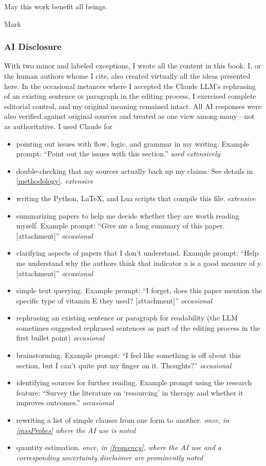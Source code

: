 \documentclass[11pt,oneside]{book}
\begin{document}
May this work benefit all beings.

Mark

\subsubsection*{AI Disclosure}
With two minor and labeled exceptions, I wrote all the content in this book. I, or the human authors whome I cite, also created virtually all the ideas presented here. In the occasional instances where I accepted the Claude LLM's rephrasing of an existing sentence or paragraph in the editing process, I exercised complete editorial control, and my original meaning remained intact. All AI responses were also verified against original sources and treated as one view among many---not as authoritative. I used Claude for
\begin{itemize}
    \item pointing out issues with flow, logic, and grammar in my writing. Example prompt: \enquote{Point out the issues with this section.} \textit{used extensively}
    \item double-checking that my sources actually back up my claims. See details in \cref{methodology}. \textit{extensive}
    \item writing the Python, \LaTeX, and Lua scripts that compile this file. \textit{extensive}
    \item summarizing papers to help me decide whether they are worth reading myself. Example prompt: \enquote{Give me a long summary of this paper. [attachment]} \textit{occasional}
    \item clarifying aspects of papers that I don't understand. Example prompt: \enquote{Help me understand why the authors think that indicator x is a good measure of y. [attachment]} \textit{occasional}
    \item simple text querying. Example prompt: \enquote{I forget, does this paper mention the specific type of vitamin E they used? [attachment]} \textit{occasional}
    \item rephrasing an existing sentence or paragraph for readability (the LLM sometimes suggested rephrased sentences as part of the editing process in the first bullet point) \textit{occasional}
    \item brainstorming. Example prompt: \enquote{I feel like something is off about this section, but I can't quite put my finger on it. Thoughts?} \textit{occasional}
    \item identifying sources for further reading. Example prompt using the research feature: \enquote{Survey the literature on \enquote{resourcing} in therapy and whether it improves outcomes.} \textit{occasional}
    \item rewriting a list of simple clauses from one form to another. \textit{once, in \cref{mssProbes} where the AI use is noted}
    \item quantity estimation. \textit{once, in \cref{frequency}, where the AI use and a corresponding uncertainty disclaimer are prominently noted}
\end{itemize}
\end{document}
